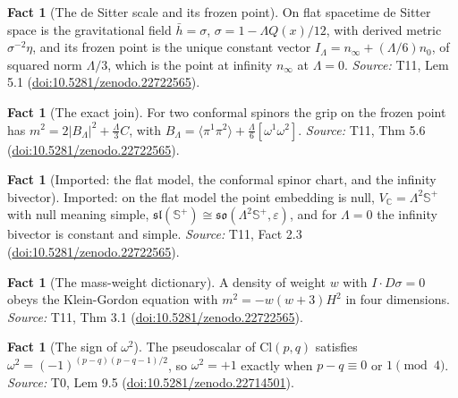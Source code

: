 \documentclass[11pt]{article}
\theoremstyle{definition}
\newtheorem{fact}[theorem]{Fact}
\theoremstyle{plain}
\providecommand{\C}{}\renewcommand{\C}{\mathbb{C}}
\providecommand{\CS}{}\renewcommand{\CS}{{\mathbb{S}^{+}}}
\providecommand{\Cl}{}\renewcommand{\Cl}{\mathrm{Cl}}
\providecommand{\hb}{}\renewcommand{\hb}{\bar{h}}
\providecommand{\so}{}\renewcommand{\so}{\mathfrak{so}}
\providecommand{\br}{}\renewcommand{\br}[1]{\langle #1\rangle}
\begin{document}
\begin{fact}[The de Sitter scale and its frozen point]\label{c:mass.de-sitter-scale-frozen-point}
On flat spacetime de Sitter space is the gravitational field $\hb = \sigma$, $\sigma = 1 - \Lambda Q(x)/12$, with derived metric $\sigma^{-2}\eta$, and its frozen point is the unique constant vector $I_\Lambda = n_\infty + (\Lambda/6)n_0$, of squared norm $\Lambda/3$, which is the point at infinity $n_\infty$ at $\Lambda = 0$.
\emph{Source:} T11, Lem 5.1 (\href{https://doi.org/10.5281/zenodo.22722565}{doi:10.5281/zenodo.22722565}).
\end{fact}

\begin{fact}[The exact join]\label{c:mass.exact-join}
For two conformal spinors the grip on the frozen point has $m^{2} = 2|B_{\Lambda}|^{2} + \tfrac{\Lambda}{3}C$, with $B_{\Lambda} = \br{\pi^{1}\pi^{2}} + \tfrac{\Lambda}{6}[\omega^{1}\omega^{2}]$.
\emph{Source:} T11, Thm 5.6 (\href{https://doi.org/10.5281/zenodo.22722565}{doi:10.5281/zenodo.22722565}).
\end{fact}

\begin{fact}[Imported: the flat model, the conformal spinor chart, and the infinity bivector]\label{c:mass.imported-flat-model-twistor-chart-infinity}
Imported: on the flat model the point embedding is null, $V_\C = \Lambda^2\CS$ with null meaning simple, $\mathfrak{sl}(\CS) \cong \so(\Lambda^2\CS, \varepsilon)$, and for $\Lambda = 0$ the infinity bivector is constant and simple.
\emph{Source:} T11, Fact 2.3 (\href{https://doi.org/10.5281/zenodo.22722565}{doi:10.5281/zenodo.22722565}).
\end{fact}

\begin{fact}[The mass-weight dictionary]\label{c:mass.mass-weight-dictionary}
A density of weight $w$ with $I \cdot D\sigma = 0$ obeys the Klein-Gordon equation with $m^{2} = -w(w+3)H^{2}$ in four dimensions.
\emph{Source:} T11, Thm 3.1 (\href{https://doi.org/10.5281/zenodo.22722565}{doi:10.5281/zenodo.22722565}).
\end{fact}

\begin{fact}[The sign of $\omega^2$]\label{c:primer.sign}
The pseudoscalar of $\Cl(p,q)$ satisfies $\omega^{2} = (-1)^{(p-q)(p-q-1)/2}$, so $\omega^{2} = +1$ exactly when $p - q \equiv 0$ or $1 \pmod 4$.
\emph{Source:} T0, Lem 9.5 (\href{https://doi.org/10.5281/zenodo.22714501}{doi:10.5281/zenodo.22714501}).
\end{fact}
\end{document}
